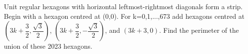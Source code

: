Unit regular hexagons with horizontal leftmost-rightmost diagonals form a strip. Begin with a hexagon centred at (0,0). For k=0,1,...,673 add hexagons centred at $(3k+\dfrac{3}{2},\dfrac{\sqrt{3}}{2})$, $(3k+\dfrac{3}{2},-\dfrac{\sqrt{3}}{2})$, and $(3k+3,0)$. Find the perimeter of the union of these 2023 hexagons.

